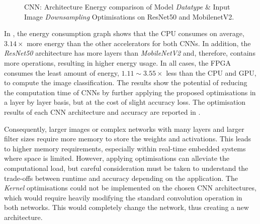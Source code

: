 \begin{figure}[!h]
    \centering
\resizebox{\columnwidth}{!}{}    %
    \caption[CNN: Comparison Energy Consumption]{CNN: Architecture Energy comparison of Model \textit{Datatype} \& Input Image \textit{Downsampling} Optimisations on ResNet50 and MobilenetV2.}
    \label{fig:CNNEnergy}
\end{figure}

In , the energy consumption graph shows that the CPU consumes on average, $3.14\times$ more energy than the other accelerators for both CNNs. In addition, the \textit{ResNet50} architecture has more layers than \textit{MobileNetV2} and, therefore, contains more operations, resulting in higher energy usage. In all cases, the FPGA consumes the least amount of energy, $1.11\sim3.55\times$ less than the CPU and GPU, to compute the image classification. The results show the potential of reducing the computation time of CNNs by further applying the proposed optimisations in a layer by layer basis, but at the cost of slight accuracy loss. The optimisation results of each CNN architecture and accuracy are reported in .

Consequently, larger images or complex networks with many layers and larger filter sizes require more memory to store the weights and activations. This leads to higher memory requirements, especially within real-time embedded systems where space is limited. However, applying optimisations can alleviate the computational load, but careful consideration must be taken to understand the trade-offs between runtime and accuracy depending on the application. The \textit{Kernel} optimisations could not be implemented on the chosen CNN architectures, which would require heavily modifying the standard convolution operation in both networks. This would completely change the network, thus creating a new architecture.



